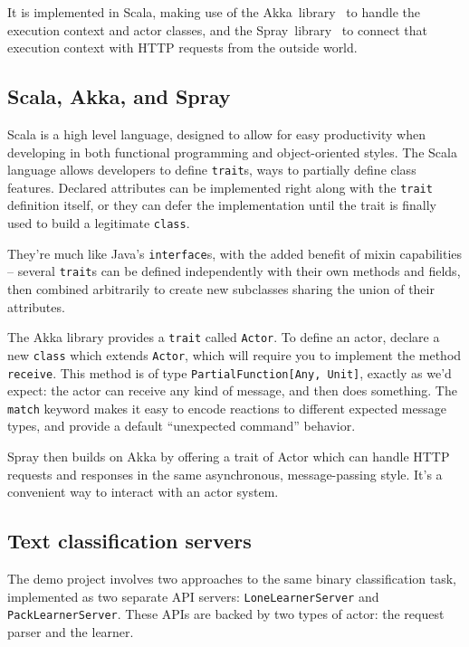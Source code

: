 \documentclass[tablecaption=bottom,wcp]{jmlr}
\begin{document}
It is implemented in Scala, making use of the Akka~library~\citep{akka_doc}
to handle the execution context and actor classes, and the Spray~library~\citep{spray_doc}
to connect that execution context with HTTP requests from the outside world.

\subsection{Scala, Akka, and Spray}

Scala is a high level language, designed to allow for easy productivity when
developing in both functional programming and object-oriented styles. The
Scala language allows developers to define \texttt{trait}s, ways to partially 
define class features. Declared attributes can be implemented right
along with the \texttt{trait} definition itself, or they can defer the implementation
until the trait is finally used to build a legitimate \texttt{class}.

They're much like Java's \texttt{interface}s, with the added benefit of mixin 
capabilities -- several \texttt{trait}s can be defined independently with their own
 methods and fields, then combined arbitrarily to create new subclasses sharing
 the union of their attributes.

The Akka library provides a \texttt{trait} called \texttt{Actor}. To define an actor, 
declare a new \texttt{class} which extends \texttt{Actor}, which will require you to
implement the method \texttt{receive}. This method is of type \texttt{PartialFunction[Any,~Unit]},
exactly as we'd expect: the actor can receive any kind of message, and then does 
something. The \texttt{match} keyword makes it easy to encode reactions to different
expected message types, and provide a default ``unexpected command'' behavior.

Spray then builds on Akka by offering a trait of Actor which can handle HTTP 
requests and responses in the same asynchronous, message-passing style.
It's a convenient way to interact with an actor system.

\subsection{Text classification servers}

The demo project involves two approaches to the same binary classification task,
implemented as two separate API servers: \texttt{LoneLearnerServer} and
\texttt{PackLearnerServer}. These APIs are backed by two types of actor: the request
parser and the learner. 
\end{document}
